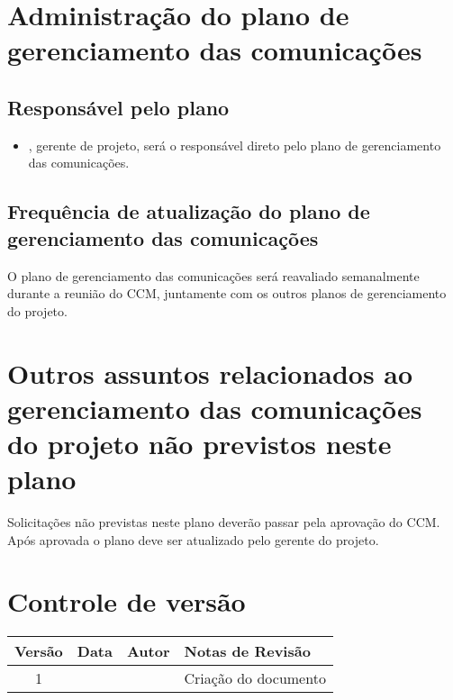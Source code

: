 \section{Administração do plano de gerenciamento das comunicações}

\subsection{Responsável pelo plano}

\begin{itemize}
	\item \projectManagerName{}, gerente de projeto, será o responsável direto pelo plano de gerenciamento das comunicações.
\end{itemize}

\subsection{Frequência de atualização do plano de gerenciamento das comunicações}

O plano de gerenciamento das comunicações será reavaliado semanalmente durante a reunião do CCM, juntamente com os outros planos de gerenciamento do projeto.

\section{Outros assuntos relacionados ao gerenciamento das comunicações do projeto não previstos neste plano}

Solicitações não previstas neste plano deverão passar pela aprovação do CCM. Após aprovada o plano deve ser atualizado pelo gerente do projeto.

\section{Controle de versão}

\begin{table}[H]
	\begin{tabularx}{\textwidth}{| c | c | X | X |}
		\hline
		\textbf{Versão} & \textbf{Data} & \textbf{Autor}        & \textbf{Notas de Revisão} \\
		\hline
		1                &               & \projectManagerName{} & Criação do documento     \\
		\hline
	\end{tabularx}
	\centering
\end{table}

